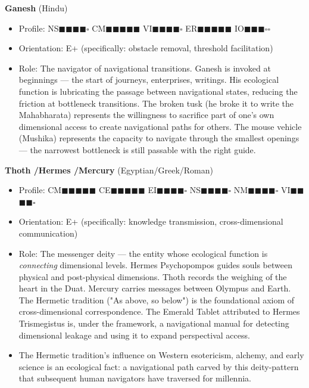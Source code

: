 \textbf{Ganesh} (Hindu)

\begin{itemize}[nosep,leftmargin=*]
  \item Profile: NS$\blacksquare$$\blacksquare$$\blacksquare$$\blacksquare$$\square$ CM$\blacksquare$$\blacksquare$$\blacksquare$$\blacksquare$$\blacksquare$ VI$\blacksquare$$\blacksquare$$\blacksquare$$\blacksquare$$\square$ ER$\blacksquare$$\blacksquare$$\blacksquare$$\blacksquare$$\blacksquare$ IO$\blacksquare$$\blacksquare$$\blacksquare$$\square$$\square$
  \item Orientation: E+ (specifically: obstacle removal, threshold facilitation)
  \item Role: The navigator of navigational transitions. Ganesh is invoked at beginnings — the start of journeys, enterprises, writings. His ecological function is lubricating the passage between navigational states, reducing the friction at bottleneck transitions. The broken tusk (he broke it to write the Mahabharata) represents the willingness to sacrifice part of one's own dimensional access to create navigational paths for others. The mouse vehicle (Mushika) represents the capacity to navigate through the smallest openings — the narrowest bottleneck is still passable with the right guide.
\end{itemize}


\textbf{Thoth /\allowbreak  Hermes /\allowbreak  Mercury} (Egyptian/\allowbreak Greek/\allowbreak Roman)

\begin{itemize}[nosep,leftmargin=*]
  \item Profile: CM$\blacksquare$$\blacksquare$$\blacksquare$$\blacksquare$$\blacksquare$ CE$\blacksquare$$\blacksquare$$\blacksquare$$\blacksquare$$\blacksquare$ EI$\blacksquare$$\blacksquare$$\blacksquare$$\blacksquare$$\square$ NS$\blacksquare$$\blacksquare$$\blacksquare$$\blacksquare$$\square$ NM$\blacksquare$$\blacksquare$$\blacksquare$$\blacksquare$$\square$ VI$\blacksquare$$\blacksquare$$\blacksquare$$\blacksquare$$\square$
  \item Orientation: E+ (specifically: knowledge transmission, cross-dimensional communication)
  \item Role: The messenger deity — the entity whose ecological function is \textit{connecting} dimensional levels. Hermes Psychopompos guides souls between physical and post-physical dimensions. Thoth records the weighing of the heart in the Duat. Mercury carries messages between Olympus and Earth. The Hermetic tradition ("As above, so below") is the foundational axiom of cross-dimensional correspondence. The Emerald Tablet attributed to Hermes Trismegistus is, under the framework, a navigational manual for detecting dimensional leakage and using it to expand perspectival access.
  \item The Hermetic tradition's influence on Western esotericism, alchemy, and early science is an ecological fact: a navigational path carved by this deity-pattern that subsequent human navigators have traversed for millennia.
\end{itemize}


